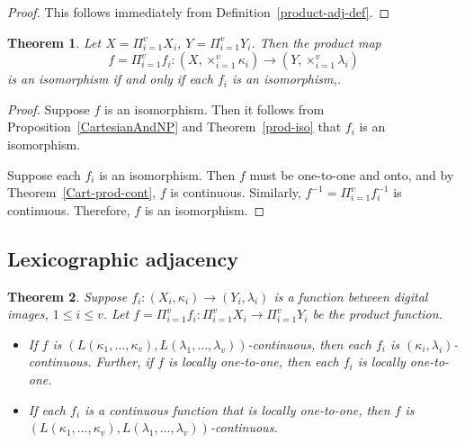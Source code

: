 \documentclass{article}
\theoremstyle{plain}
\newtheorem{thm}{Theorem}
\theoremstyle{definition}
\numberwithin{thm}{section}
\begin{document}
\begin{proof}
This follows immediately from
Definition~\ref{product-adj-def}.
\end{proof}

\begin{thm}
\label{product-cont}
Let $X=\Pi_{i=1}^v X_i$, $Y=\Pi_{i=1}^v Y_i$.
Then the product map
\[ f=\Pi_{i=1}^v f_i: (X, \times_{i=1}^v \kappa_i) \to (Y, \times_{i=1}^v \lambda_i) \]
is an isomorphism if and only if 
each $f_i$ is an isomorphism,.
\end{thm}

\begin{proof}
Suppose $f$ is an isomorphism.
Then it follows from Proposition~\ref{CartesianAndNP} and 
Theorem~\ref{prod-iso} that $f_i$ is an isomorphism.

Suppose each $f_i$ is an isomorphism. Then
$f$ must be one-to-one and onto, and by Theorem~\ref{Cart-prod-cont}, $f$ is continuous.
Similarly, $f^{-1}=\Pi_{i=1}^v f_i^{-1}$ is continuous. Therefore,
$f$ is an isomorphism.
\end{proof}

\subsection{Lexicographic adjacency}
\begin{thm}
\label{lexico-1-1}
Suppose $f_i: (X_i,\kappa_i) \to (Y_i,\lambda_i)$ is a function
between digital images, $1 \le i \le v$. Let $f=\Pi_{i=1}^v f_i: \Pi_{i=1}^v X_i \to \Pi_{i=1}^v Y_i$ be the product function.
\begin{itemize}
\item If $f$ is $(L(\kappa_1,\ldots,\kappa_v),L(\lambda_1,\ldots,\lambda_v))$-continuous,
then each $f_i$ is $(\kappa_i,\lambda_i)$-continuous. Further,
if $f$ is locally one-to-one, then each $f_i$ is locally one-to-one.
\item If each $f_i$ is a continuous function that is
locally one-to-one, then
$f$ is
$(L(\kappa_1,\ldots,\kappa_v),L(\lambda_1,\ldots,\lambda_v))$-continuous.
\end{itemize}
\end{thm}
\end{document}
